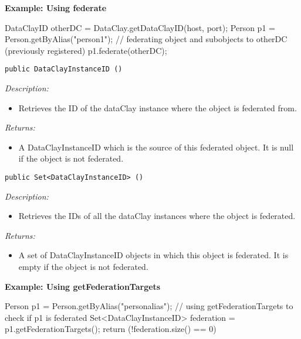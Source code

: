 \begin{tBox}
\textcolor{basecolor} {\bf Example: Using federate}
\begin{java}
DataClayID otherDC = DataClay.getDataClayID(host, port);
Person p1 = Person.getByAlias("person1");
// federating object and subobjects to otherDC (previously registered)
p1.federate(otherDC);
\end{java}
\end{tBox}


\begin{dBox}
\texttt{public DataClayInstanceID ()}
\LINE

{\it Description:}

\begin{itemize}
 \item Retrieves the ID of the dataClay instance where the object is federated from. 
\end{itemize}

{\it Returns:}

\begin{itemize}
 \item A DataClayInstanceID which is the source of this federated object.  
 It is null if the object is not federated.
\end{itemize}

\end{dBox}


\begin{dBox}
\texttt{public Set<DataClayInstanceID> ()}
\LINE

{\it Description:}

\begin{itemize}
 \item Retrieves the IDs of all the dataClay instances where the object is federated. 
\end{itemize}

{\it Returns:}

\begin{itemize}
 \item A set of DataClayInstanceID objects in which this object is federated. 
 It is empty if the object is not federated.
\end{itemize}

\end{dBox}

\begin{tBox}
\textcolor{basecolor} {\bf Example: Using getFederationTargets}
\begin{java}
Person p1 = Person.getByAlias("personalias");
// using getFederationTargets to check if p1 is federated
Set<DataClayInstanceID> federation = p1.getFederationTargets();
return (!federation.size() == 0)
\end{java}
\end{tBox}


